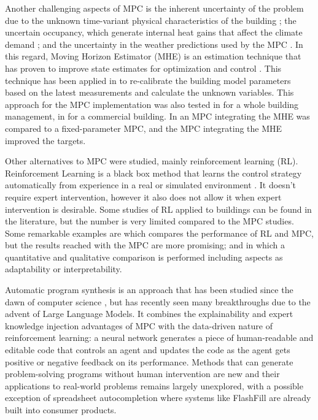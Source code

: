 Another challenging aspects of MPC is the inherent uncertainty of the problem due to the unknown time-variant physical characteristics of the building \cite{Maasoumy2014}; the uncertain occupancy, which generate internal heat gains that affect the climate demand \cite{}; and the uncertainty in the weather predictions used by the MPC \cite{Oldewurtel2012}. In this regard, Moving Horizon Estimator (MHE) is an estimation technique that has proven to  improve state estimates for optimization and control \cite{Hedengren2017}. This technique has been applied in \cite{Simmons2019} to re-calibrate the building model parameters based on the latest measurements and calculate the unknown variables. This approach for the MPC implementation was also tested in \cite{Gates2021} for a whole building management, in \cite{Kim2018} for a commercial building. In \cite{Zabala2023} an MPC integrating the MHE was compared to a fixed-parameter MPC, and the MPC integrating the MHE improved the targets.

Other alternatives to MPC were studied, mainly reinforcement learning (RL). Reinforcement Learning is a black box method that learns the control strategy automatically from experience in a real or simulated environment \cite{Belyadi2021}. It doesn’t require expert intervention, however it also does not allow it when expert intervention is desirable. Some studies of RL applied to buildings can be found in the literature, but the number is very limited compared to the MPC studies. Some remarkable examples are \cite{Arroyo2022} which compares the performance of RL and MPC, but the results reached with the MPC are more promising; and \cite{Stoffel2023} in which a quantitative and qualitative comparison is performed including aspects as adaptability or interpretability. 

Automatic program synthesis is an approach that has been studied since the dawn of computer science \cite{Balzer1985}, but has recently seen many breakthroughs due to the advent of Large Language Models. It combines the explainability and expert knowledge injection advantages of MPC with the data-driven nature of reinforcement learning: a neural network generates a piece of human-readable and editable code that controls an agent and updates the code as the agent gets positive or negative feedback on its performance. Methods that can generate problem-solving programs without human intervention are new and their applications to real-world problems remains largely unexplored, with a possible exception of spreadsheet autocompletion where systems like FlashFill \cite{Gulwani2011} are already built into consumer products.

